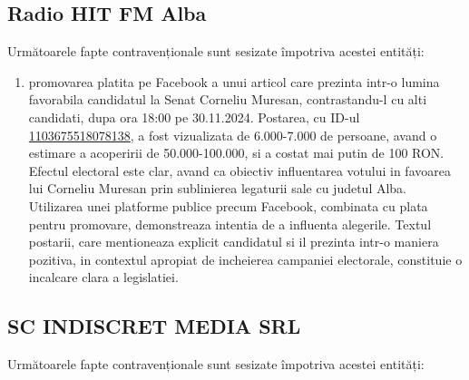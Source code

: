 \documentclass[a4paper,12pt]{article}
\begin{document}
\vspace{0.5cm}

\subsection{Radio HIT FM Alba}
Următoarele fapte contravenționale sunt sesizate împotriva acestei entități:

\begin{enumerate}[leftmargin=*, label=\arabic*.)]
    \item promovarea platita pe Facebook a unui articol care prezinta intr-o lumina favorabila candidatul la Senat Corneliu Muresan, contrastandu-l cu alti candidati, dupa ora 18:00 pe 30.11.2024.  Postarea, cu ID-ul \href{https://www.facebook.com/ads/library/?id=1103675518078138}{1103675518078138},  a fost vizualizata de 6.000-7.000 de persoane, avand o estimare a acoperirii de 50.000-100.000,  si a costat mai putin de 100 RON.  Efectul electoral este clar, avand ca obiectiv influentarea votului in favoarea lui Corneliu Muresan prin sublinierea legaturii sale cu judetul Alba.  Utilizarea unei platforme publice precum Facebook, combinata cu plata pentru promovare, demonstreaza intentia de a influenta alegerile.  Textul postarii, care mentioneaza explicit candidatul si il prezinta intr-o maniera pozitiva, in contextul apropiat de incheierea campaniei electorale, constituie o incalcare clara a legislatiei.
\end{enumerate}

\vspace{0.5cm}

\subsection{SC INDISCRET MEDIA SRL}
Următoarele fapte contravenționale sunt sesizate împotriva acestei entități:
\end{document}
